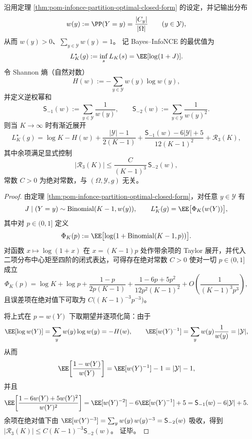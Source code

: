 
\begin{theorem}\label{thm:pom-infonce-bayes-optimal-third-order-largeK}
沿用定理 \ref{thm:pom-infonce-partition-optimal-closed-form} 的设定，并记输出分布
\[
w(y):=\PP(Y=y)=\frac{|C_y|}{|\Omega|}\qquad(y\in\mathcal Y),
\]
从而 \(w(y)>0\)、\(\sum_{y\in\mathcal Y}w(y)=1\)。
记 Bayes--InfoNCE 的最优值为
\[
L_K^\star(g):=\inf_s L_K(s)=\EE[\log(1+J)].
\]
令 Shannon 熵（自然对数）
\[
H(w):=-\sum_{y\in\mathcal Y}w(y)\log w(y),
\]
并定义逆权幂和
\[
\mathsf S_{-1}(w):=\sum_{y\in\mathcal Y}\frac{1}{w(y)},
\qquad
\mathsf S_{-2}(w):=\sum_{y\in\mathcal Y}\frac{1}{w(y)^2}.
\]
则当 \(K\to\infty\) 时有渐近展开
\[
L_K^\star(g)
=\log K-H(w)
+\frac{|\mathcal Y|-1}{2(K-1)}
+\frac{\mathsf S_{-1}(w)-6|\mathcal Y|+5}{12(K-1)^2}
+\mathcal R_3(K),
\]
其中余项满足显式控制
\[
\bigl|\mathcal R_3(K)\bigr|
\le \frac{C}{(K-1)^3}\,\mathsf S_{-2}(w),
\]
常数 \(C>0\) 为绝对常数，与 \((\Omega,\mathcal Y,g)\) 无关。
\end{theorem}
\begin{proof}
由定理 \ref{thm:pom-infonce-partition-optimal-closed-form}，对任意 \(y\in\mathcal Y\) 有
\[
J\mid(Y=y)\sim \mathrm{Binomial}(K-1,w(y)),
\qquad
L_K^\star(g)=\EE\bigl[\Phi_K(w(Y))\bigr],
\]
其中对 \(p\in(0,1]\) 定义
\[
\Phi_K(p):=\EE\bigl[\log(1+\mathrm{Binomial}(K-1,p))\bigr].
\]
对函数 \(x\mapsto \log(1+x)\) 在 \(x=(K-1)p\) 处作带余项的 Taylor 展开，并代入二项分布中心矩至四阶的闭式表达，可得存在绝对常数 \(C>0\) 使对一切 \(p\in(0,1]\) 成立
\[
\Phi_K(p)
=\log K+\log p
+\frac{1-p}{2p(K-1)}
+\frac{1-6p+5p^2}{12p^2(K-1)^2}
+O\!\left(\frac{1}{(K-1)^3p^3}\right),
\]
且误差项在绝对值下可取为 \(C\bigl((K-1)^{-3}p^{-3}\bigr)\)。
\par
将上式在 \(p=w(Y)\) 下取期望并逐项化简：由于
\[
\EE[\log w(Y)]=\sum_y w(y)\log w(y)=-H(w),
\qquad
\EE[w(Y)^{-1}]=\sum_y w(y)\frac{1}{w(y)}=|\mathcal Y|,
\]
从而
\[
\EE\!\left[\frac{1-w(Y)}{w(Y)}\right]=\EE[w(Y)^{-1}]-1=|\mathcal Y|-1,
\]
并且
\[
\EE\!\left[\frac{1-6w(Y)+5w(Y)^2}{w(Y)^2}\right]
=\EE[w(Y)^{-2}]-6\EE[w(Y)^{-1}]+5
=\mathsf S_{-1}(w)-6|\mathcal Y|+5.
\]
余项在绝对值下由
\(
\EE[w(Y)^{-3}]=\sum_y w(y)\,w(y)^{-3}=\mathsf S_{-2}(w)
\)
吸收，得到 \(|\mathcal R_3(K)|\le C(K-1)^{-3}\mathsf S_{-2}(w)\)。
证毕。
\end{proof}

